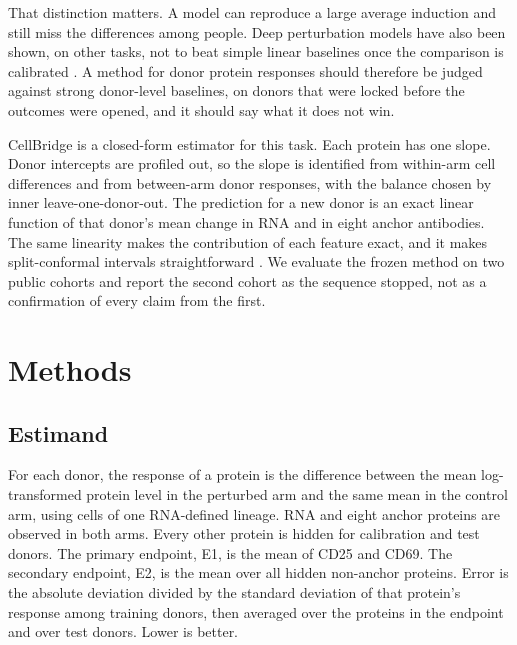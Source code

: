 \documentclass[10pt,a4paper]{article}
\begin{document}
That distinction matters. A model can reproduce a large average induction and still miss the differences among people. Deep perturbation models have also been shown, on other tasks, not to beat simple linear baselines once the comparison is calibrated \citep{ahlmann2025}. A method for donor protein responses should therefore be judged against strong donor-level baselines, on donors that were locked before the outcomes were opened, and it should say what it does not win.

CellBridge is a closed-form estimator for this task. Each protein has one slope. Donor intercepts are profiled out, so the slope is identified from within-arm cell differences and from between-arm donor responses, with the balance chosen by inner leave-one-donor-out. The prediction for a new donor is an exact linear function of that donor's mean change in RNA and in eight anchor antibodies. The same linearity makes the contribution of each feature exact, and it makes split-conformal intervals straightforward \citep{angelopoulos2022}. We evaluate the frozen method on two public cohorts and report the second cohort as the sequence stopped, not as a confirmation of every claim from the first.

\section{Methods}

\subsection{Estimand}
For each donor, the response of a protein is the difference between the mean log-transformed protein level in the perturbed arm and the same mean in the control arm, using cells of one RNA-defined lineage. RNA and eight anchor proteins are observed in both arms. Every other protein is hidden for calibration and test donors. The primary endpoint, E1, is the mean of CD25 and CD69. The secondary endpoint, E2, is the mean over all hidden non-anchor proteins. Error is the absolute deviation divided by the standard deviation of that protein's response among training donors, then averaged over the proteins in the endpoint and over test donors. Lower is better.
\end{document}
